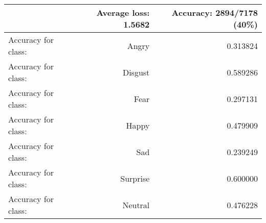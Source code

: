 \begin{tabular}{lrr}
\toprule
{} & Average loss: 1.5682 &  Accuracy: 2894/7178 (40\%) \\
\midrule
Accuracy for class: &                Angry &                   0.313824 \\
Accuracy for class: &              Disgust &                   0.589286 \\
Accuracy for class: &                 Fear &                   0.297131 \\
Accuracy for class: &                Happy &                   0.479909 \\
Accuracy for class: &                  Sad &                   0.239249 \\
Accuracy for class: &             Surprise &                   0.600000 \\
Accuracy for class: &              Neutral &                   0.476228 \\
\bottomrule
\end{tabular}
